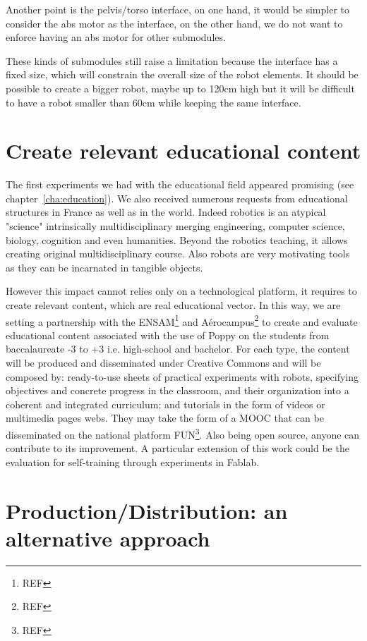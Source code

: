 Another point is the pelvis/torso interface, on one hand, it would be simpler to consider the abs motor as the interface, on the other hand, we do not want to enforce having an abs motor for other submodules.

These kinds of submodules still raise a limitation because the interface has a fixed size, which will constrain the overall size of the robot elements. It should be possible to create a bigger robot, maybe up to 120cm high but it will be difficult to have a robot smaller than 60cm while keeping the same interface.



\section{Create relevant educational content} %

The first experiments we had with the educational field appeared promising (see chapter~\ref{cha:education}). We also received numerous requests from educational structures in France as well as in the world. Indeed robotics is an atypical "science" intrinsically multidisciplinary merging engineering, computer science, biology, cognition and even humanities. Beyond the robotics teaching, it allows creating original multidisciplinary course. Also robots are very motivating tools as they can be incarnated in tangible objects.

However this impact cannot relies only on a technological platform, it requires to create relevant content, which are real educational vector.
In this way, we are setting a partnership with the ENSAM\footnote{REF} and Aérocampus\footnote{REF} to create and evaluate educational content associated with the use of Poppy on the students from baccalaureate -3 to +3 i.e. high-school and bachelor. For each type, the content will be produced and disseminated under Creative Commons and will be composed by: ready-to-use sheets of practical experiments with robots, specifying objectives and concrete progress in the classroom, and their organization into a coherent and integrated curriculum; and tutorials in the form of videos or multimedia pages webs. They may take the form of a MOOC that can be disseminated on the national platform FUN\footnote{REF}. Also being open source, anyone can contribute to its improvement. A particular extension of this work could be the evaluation for self-training through experiments in Fablab.




\section{Production/Distribution: an alternative approach} %

